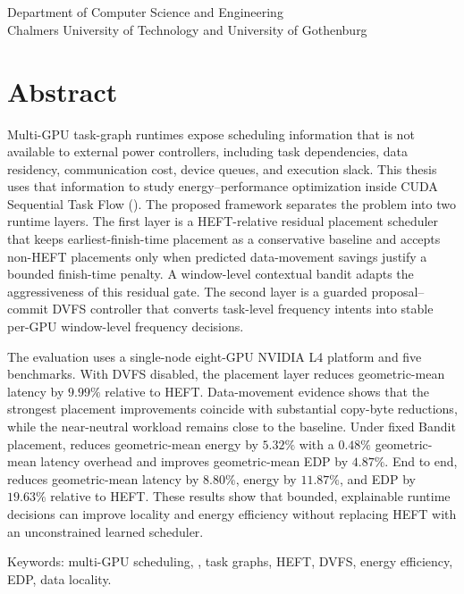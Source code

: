 \multiLineTitle{0.1cm}\\
\thesisAuthors\\
Department of Computer Science and Engineering\\
Chalmers University of Technology and University of Gothenburg

\thispagestyle{plain}			%
\section*{Abstract}
Multi-GPU task-graph runtimes expose scheduling information that is not
available to external power controllers, including task dependencies, data
residency, communication cost, device queues, and execution slack. This thesis
uses that information to study energy--performance optimization inside CUDA
Sequential Task Flow (\CUDASTF{}). The proposed framework separates the problem
into two runtime layers. The first layer is a HEFT-relative residual placement
scheduler that keeps earliest-finish-time placement as a conservative baseline
and accepts non-HEFT placements only when predicted data-movement savings
justify a bounded finish-time penalty. A window-level contextual bandit adapts
the aggressiveness of this residual gate. The second layer is a guarded
proposal--commit DVFS controller that converts task-level frequency intents
into stable per-GPU window-level frequency decisions.

The evaluation uses a single-node eight-GPU NVIDIA L4 platform and five
\CUDASTF{} benchmarks. With DVFS disabled, the placement layer reduces
geometric-mean latency by \(9.99\%\) relative to HEFT. Data-movement evidence
shows that the strongest placement improvements coincide with substantial
copy-byte reductions, while the near-neutral workload remains close to the
baseline. Under fixed Bandit placement, \WinDVFS{} reduces geometric-mean energy
by \(5.32\%\) with a \(0.48\%\) geometric-mean latency overhead and improves
geometric-mean EDP by \(4.87\%\). End to end, \BanditWinDVFS{} reduces
geometric-mean latency by \(8.80\%\), energy by \(11.87\%\), and EDP by
\(19.63\%\) relative to HEFT. These results show that bounded, explainable
runtime decisions can improve locality and energy efficiency without replacing
HEFT with an unconstrained learned scheduler.

\vfill
Keywords: multi-GPU scheduling, \CUDASTF{}, task graphs, HEFT, DVFS, energy efficiency, EDP, data locality.

\newpage				%
\thispagestyle{empty}
\mbox{}
